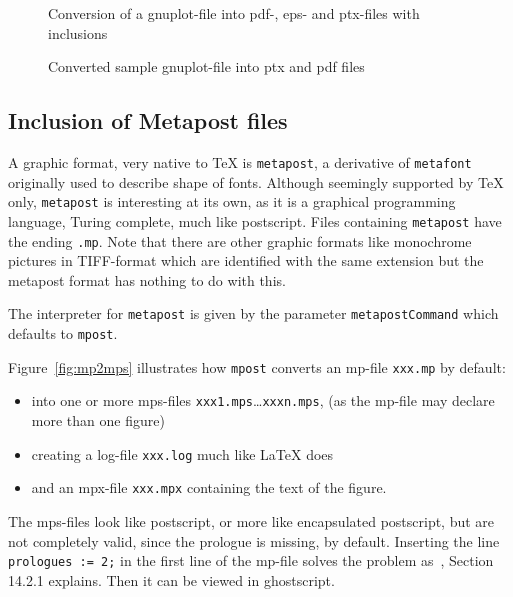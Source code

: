 \documentclass[12pt]{article}
\begin{document}
\begin{figure}[htb]
\begin{center}

\end{center}
\caption{\label{fig:gp2pdf}Conversion of a gnuplot-file 
into pdf-, eps- and ptx-files with inclusions}
\end{figure}

\begin{figure}[htb]
\begin{center}

\end{center}
\caption{\label{fig:gnuplot}
Converted sample gnuplot-file into ptx and pdf files }
\end{figure}


\subsection{Inclusion of Metapost files}\label{subsec:metapost}

A graphic format, very native to TeX is {\tt metapost}, 
a derivative of {\tt metafont} originally used to describe shape of fonts. 
Although seemingly supported by \TeX{} only, 
{\tt metapost} is interesting at its own, 
as it is a graphical programming language, 
Turing complete, much like postscript. 
Files containing {\tt metapost} have the ending {\tt .mp}. 
Note that there are other graphic formats 
like monochrome pictures in TIFF-format 
which are identified with the same extension 
but the metapost format has nothing to do with this. 

The interpreter for {\tt metapost} 
is given by the parameter {\tt metapostCommand} 
which defaults to {\tt mpost}. 


Figure~\ref{fig:mp2mps} illustrates how {\tt mpost} converts an \gls{mp}-file 
{\tt xxx.mp} by default: 
%
\begin{itemize}
\item
into one or more \gls{mps}-files {\tt xxx1.mps}\dots {\tt xxxn.mps}, 
(as the mp-file may declare more than one figure) 
\item
creating a log-file {\tt xxx.log} much like \LaTeX{} does 
\item
and an \gls{mpx}-file {\tt xxx.mpx} containing the text of the figure. 
\end{itemize}

The mps-files look like postscript, or more like encapsulated postscript, 
but are not completely valid, since the prologue is missing, by default. 
Inserting the line {\tt prologues := 2;} in the first line of the mp-file 
solves the problem as~\cite{MPost}, Section 14.2.1 explains. 
Then it can be viewed in ghostscript. 
\end{document}
